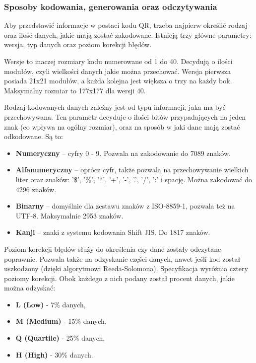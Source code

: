 \subsubsection*{Sposoby kodowania, generowania oraz odczytywania}
Aby przedstawić informacje w postaci kodu QR, trzeba najpierw określić rodzaj oraz ilość danych, jakie mają zostać zakodowane. Istnieją trzy główne parametry: wersja, typ danych oraz poziom korekcji błędów.

Wersje to inaczej rozmiary kodu numerowane od 1 do 40. Decydują o ilości modułów, czyli wielkości danych jakie można przechować. Wersja pierwsza posiada 21x21 modułów, a każda kolejna jest większa o trzy na każdy bok. Maksymalny rozmiar to 177x177 dla wersji 40. 

Rodzaj kodowanych danych zależny jest od typu informacji, jaka ma być przechowywana. Ten parametr decyduje o ilości bitów przypadających na jeden znak (co wpływa na ogólny rozmiar), oraz na sposób w jaki dane mają zostać odkodowane. Są to:
\begin{itemize}
	\item \textbf{Numeryczny} -- cyfry 0 - 9. Pozwala na zakodowanie do 7089 znaków.
	\item \textbf{Alfanumeryczny} -- oprócz cyfr, także pozwala na przechowywanie wielkich liter oraz znaków: '\$', '\%', '*', '+', '-', '.', '/', ':' i spację. Można zakodować do 4296 znaków. 
	\item \textbf{Binarny} -- domyślnie dla zestawu znaków z ISO-8859-1, pozwala też na UTF-8. Maksymalnie 2953 znaków.
	\item \textbf{Kanji} -- znaki z systemu kodowania Shift JIS. Do 1817 znaków.
\end{itemize}

Poziom korekcji błędów służy do określenia czy dane zostały odczytane poprawnie. Pozwala także na odzyskanie części danych, nawet jeśli kod został uszkodzony (dzięki algorytmowi Reeda-Solomona). Specyfikacja wyróżnia cztery poziomy korekcji. Obok każdego z nich podany został procent danych, jakie można odzyskać:
\begin{itemize}
	\item \textbf{L (Low)} - 7\% danych,
	\item \textbf{M (Medium)} - 15\% danych,
	\item \textbf{Q (Quartile)} - 25\% danych,
	\item \textbf{H (High)} - 30\% danych.
\end{itemize}

